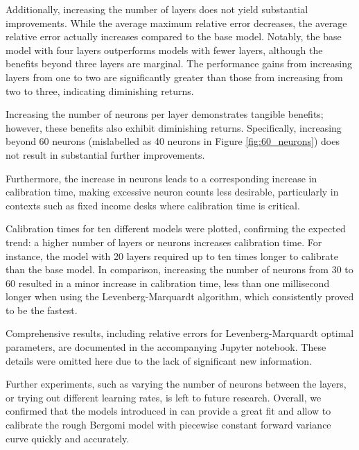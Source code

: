 \documentclass{article}
\theoremstyle{remark}
\begin{document}
Additionally, increasing the number of layers does not yield substantial improvements.
While the average maximum relative error decreases, the average relative error actually increases compared to the base model.
Notably, the base model with four layers outperforms models with fewer layers,
although the benefits beyond three layers are marginal.
The performance gains from increasing layers from one to two are significantly greater than those from increasing from two to three,
indicating diminishing returns.

Increasing the number of neurons per layer demonstrates tangible benefits;
however, these benefits also exhibit diminishing returns.
Specifically, increasing beyond 60 neurons (mislabelled as 40 neurons in Figure \ref{fig:60_neurons})
does not result in substantial further improvements.

Furthermore, the increase in neurons leads to a corresponding increase in calibration time,
making excessive neuron counts less desirable, particularly in contexts such as fixed income desks where calibration time is critical.

Calibration times for ten different models were plotted, confirming the expected trend:
a higher number of layers or neurons increases calibration time.
For instance, the model with 20 layers required up to ten times longer to calibrate than the base model.
In comparison, increasing the number of neurons from 30 to 60 resulted in a minor increase in calibration time,
less than one millisecond longer when using the Levenberg-Marquardt algorithm, which consistently proved to be the fastest.

Comprehensive results, including relative errors for Levenberg-Marquardt optimal parameters,
are documented in the accompanying Jupyter notebook. These details were omitted here due to the lack of significant new information.

Further experiments, such as varying the number of neurons between the layers, or trying out different learning rates, is left to future research.
Overall, we confirmed that the models introduced in \cite{HMM19} can provide a great fit and allow to calibrate
the rough Bergomi model with piecewise constant forward variance curve quickly and accurately.
\end{document}
